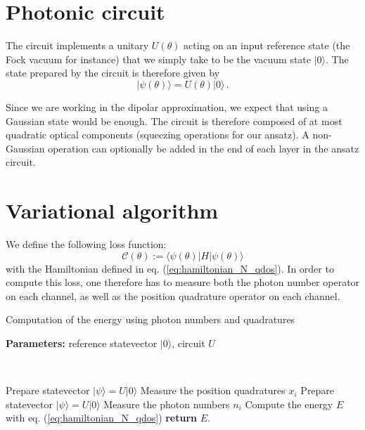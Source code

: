 \documentclass[reprint, amsmath, amssymb, aps]{revtex4-2}
\begin{document}
\section{Photonic circuit}

    The circuit implements a unitary $U(\theta)$ acting on an input reference state (the Fock vacuum for instance) that we simply take to be the vacuum state $|0\rangle$. The state prepared by the circuit is therefore given by
    \begin{equation}
        |\psi(\theta)\rangle = U(\theta)|0\rangle\,.
    \end{equation}

    Since we are working in the dipolar approximation, we expect that using a Gaussian state would be enough. The circuit is therefore composed of at most quadratic optical components (squeezing operations for our ansatz). A non-Gaussian operation can optionally be added in the end of each layer in the ansatz circuit.

\section{Variational algorithm}

    We define the following loss function:
    \begin{equation}
        \mathcal C(\theta) := \langle\psi(\theta)|H|\psi(\theta)\rangle
    \end{equation}
    with the Hamiltonian defined in eq. (\ref{eq:hamiltonian_N_qdos}).
    In order to compute this loss, one therefore has to measure both the photon number operator on each channel, as well as the position quadrature operator on each channel.
    \newpage

    \begin{algorithm}
        \caption{Computation of the energy using photon numbers and quadratures}\label{alg:energy_computation}
            \textbf{Parameters:} reference statevector $|0\rangle$, circuit $U$

            \

            Prepare statevector $|\psi\rangle = U|0\rangle$\;
            Measure the position quadratures $x_i$\;
            Prepare statevector $|\psi\rangle = U|0\rangle$\;
            Measure the photon numbers $n_i$\;
            Compute the energy $E$ with eq. (\ref{eq:hamiltonian_N_qdos})\;
            \textbf{return} $E$.
    \end{algorithm}
\end{document}
